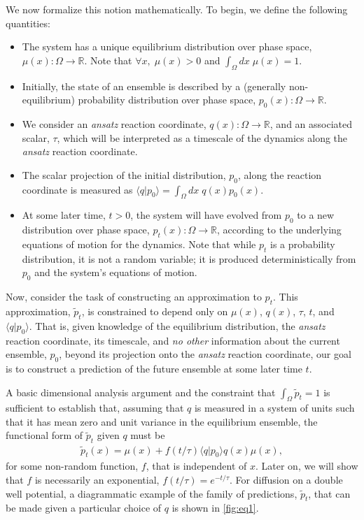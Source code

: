 \documentclass[aip, jcp, reprint, nolinenumbers, twocolumn, nobalancelastpage, nofootinbib]{revtex4-1}
\begin{document}
We now formalize this notion mathematically. To begin, we define the following quantities:
\begin{itemize}
\item The system has a unique equilibrium distribution over phase space, $\mu(x) : \Omega \rightarrow \mathbb{R}$. Note that $\forall x,\; \mu(x) > 0$ and $\int_\Omega dx \; \mu(x) = 1$.
\item Initially, the state of an ensemble is described by a (generally non-equilibrium) probability distribution over phase space, $p_0(x) : \Omega \rightarrow \mathbb{R}$.
\item We consider an \emph{ansatz} reaction coordinate, $q(x) : \Omega \rightarrow \mathbb{R}$, and an associated scalar, $\tau$, which will be interpreted as a timescale of the dynamics along the \emph{ansatz} reaction coordinate.
\item The scalar projection of the initial distribution, $p_0$, along the reaction coordinate is measured as $\langle q | p_0 \rangle = \int_\Omega dx\; q(x) p_0(x)$.
\item At some later time, $t>0$, the system will have evolved from $p_0$ to a new distribution over phase space, $p_t(x) : \Omega \rightarrow \mathbb{R}$, according to the underlying equations of motion for the dynamics. Note that while $p_t$ is a probability distribution, it is not a random variable; it is produced deterministically from $p_0$ and the system's equations of motion.
\end{itemize}

Now, consider the task of constructing an approximation to $p_t$. This approximation, $\tilde{p}_t$, is constrained to depend only on $\mu(x)$, $q(x)$, $\tau$, $t$, and $\langle q | p_0 \rangle$. That is, given knowledge of the equilibrium distribution, the \emph{ansatz} reaction coordinate, its timescale, and \emph{no other} information about the current ensemble, $p_0$, beyond its projection onto the \emph{ansatz} reaction coordinate, our goal is to construct a prediction of the future ensemble at some later time $t$.

A basic dimensional analysis argument and the constraint that $\int_\Omega \tilde{p}_t=1$ is sufficient to establish that, assuming that $q$ is measured in a system of units such that it has mean zero and unit variance in the equilibrium ensemble, the functional form of $\tilde{p}_t$ given $q$ must be
\begin{align}
\label{eq:functionalform}
\tilde{p}_t(x) = \mu(x) + f(t/\tau) \langle q| p_0 \rangle q(x) \mu(x),
\end{align}
for some non-random function, $f$, that is independent of $x$. Later on, we will show that $f$ is necessarily an exponential, $f(t/\tau)=e^{-t/\tau}$. For diffusion on a double well potential, a diagrammatic example of the family of predictions, $\tilde{p}_t$, that can be made given a particular choice of $q$ is shown in \cref{fig:eq1}.
\end{document}
